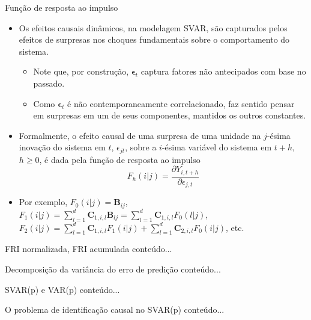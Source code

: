 \documentclass[11pt]{beamer}
\begin{document}
\begin{frame}{Função de resposta ao impulso}
	\begin{itemize}
		\item Os efeitos causais dinâmicos, na modelagem SVAR, são capturados pelos efeitos de surpresas nos choques fundamentais sobre o comportamento do sistema.
		\begin{itemize}
			\item Note que, por construção, $\boldsymbol{\epsilon}_t$ captura fatores não antecipados com base no passado. 
			\item Como $\boldsymbol{\epsilon}_t$ é não contemporaneamente correlacionado, faz sentido pensar em surpresas em um de seus componentes, mantidos os outros constantes.
	\end{itemize}
	\item Formalmente, o efeito causal de uma surpresa de uma unidade na $j$-ésima inovação do sistema em $t$, $\epsilon_{jt}$, sobre a $i$-ésima variável do sistema em $t+h$, $h\geq 0$, é dada pela {\color{blue}função de resposta ao impulso}
	$$F_{h}(i|j)  = \frac{\partial Y_{i,t+h}}{\partial \epsilon_{j,t}}$$
	\item Por exemplo, $F_{0}(i|j) = \boldsymbol{B}_{ij}$, $F_{1}(i|j) = \sum_{l=1}^d\boldsymbol{C}_{1, i,l} \boldsymbol{B}_{lj} = \sum_{l=1}^d\boldsymbol{C}_{1, i,l} F_{0}(l|j)$, $F_2(i|j) = \sum_{l=1}^d \boldsymbol{C}_{1, i,l} F_{1}(i|j) + \sum_{l=1}^d\boldsymbol{C}_{2, i,l} F_{0}(i|j)$, etc.
	\end{itemize}
\end{frame}

\begin{frame}{FRI normalizada, FRI acumulada}
	conteúdo...
\end{frame}


\begin{frame}{Decomposição da variância do erro de predição}
	conteúdo...
\end{frame}


\begin{frame}{SVAR(p) e VAR(p)}
	conteúdo...
\end{frame}

\begin{frame}{O problema de identificação causal no SVAR(p)}
	conteúdo...
\end{frame}
\end{document}
